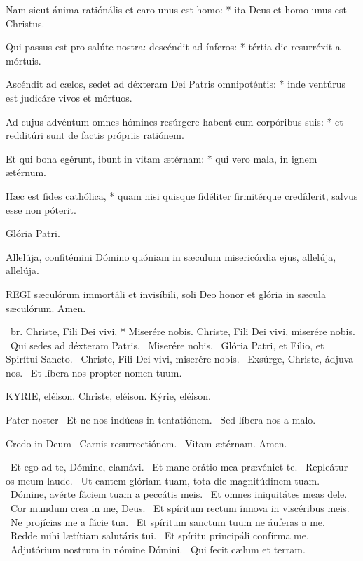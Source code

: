Nam sicut ánima ratiónális et caro unus est homo: * ita Deus et homo unus est Christus.

Qui passus est pro salúte nostra: descéndit ad ínferos: * tértia die resurréxit a mórtuis.

Ascéndit ad cælos, sedet ad déxteram Dei Patris omnipoténtis: * inde ventúrus est judicáre vivos et mórtuos.

Ad cujus advéntum omnes hómines resúrgere habent cum corpóribus suis: * et redditúri sunt de factis própriis ratiónem.

Et qui bona egérunt, ibunt in vitam ætérnam: * qui vero mala, in ignem ætérnum.

Hæc est fides cathólica, * quam nisi quisque fidéliter firmitérque credíderit, salvus esse non póterit.

Glória Patri.


 Allelúja, confitémini Dómino quóniam in sæculum misericórdia ejus, allelúja, allelúja.


\lettrine[lines=2]{R}{EGI} sæculórum immortáli et invisíbili, soli Deo honor et glória in sæcula sæculórum. Amen.

\R\ br. Christe, Fili Dei vivi, * Miserére nobis.  Christe, Fili Dei vivi, miserére nobis. \V\ Qui sedes ad déxteram Patris. \R\ Miserére nobis. \V\ Glória Patri, et Fílio, et Spirítui Sancto. \R\ Christe, Fili Dei vivi, miserére nobis. \V\ Exsúrge, Christe, ádjuva nos. \R\ Et líbera nos propter nomen tuum.


KYRIE, eléison. Christe, eléison. Kýrie, eléison.

Pater noster  \V\ Et ne nos indúcas in tentatiónem. \R\ Sed líbera nos a malo.

Credo in Deum  \V\ Carnis resurrectiónem. \R\ Vitam ætérnam. Amen.

\V\ Et ego ad te, Dómine, clamávi. \R\ Et mane orátio mea prævéniet te. \V\ Repleátur os meum laude. \R\ Ut cantem glóriam tuam, tota die magnitúdinem tuam. \V\ Dómine, avérte fáciem tuam a peccátis meis. \R\ Et omnes iniquitátes meas dele. \V\ Cor mundum crea in me, Deus. \R\ Et spíritum rectum ínnova in viscéribus meis. \V\ Ne projícias me a fácie tua. \R\ Et spíritum sanctum tuum ne áuferas a me. \V\ Redde mihi lætítiam salutáris tui. \R\ Et spíritu principáli confírma me. \V\ Adjutórium nostrum in nómine Dómini. \R\ Qui fecit cælum et terram.

